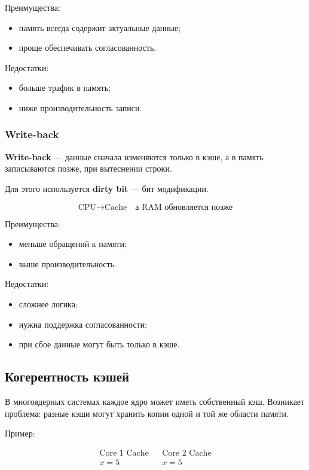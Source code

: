 \documentclass[12pt,a4paper]{article}
\theoremstyle{remark}
\begin{document}
Преимущества:
\begin{itemize}
    \item память всегда содержит актуальные данные;
    \item проще обеспечивать согласованность.
\end{itemize}

Недостатки:
\begin{itemize}
    \item больше трафик в память;
    \item ниже производительность записи.
\end{itemize}

\subsubsection{Write-back}

\textbf{Write-back} --- данные сначала изменяются только в кэше, а в память записываются позже, при вытеснении строки.

Для этого используется \textbf{dirty bit} --- бит модификации.

\[
\boxed{\text{CPU}}
\rightarrow
\boxed{\text{Cache}}
\quad
\text{а RAM обновляется позже}
\]

Преимущества:
\begin{itemize}
    \item меньше обращений к памяти;
    \item выше производительность.
\end{itemize}

Недостатки:
\begin{itemize}
    \item сложнее логика;
    \item нужна поддержка согласованности;
    \item при сбое данные могут быть только в кэше.
\end{itemize}

\subsection{Когерентность кэшей}

В многоядерных системах каждое ядро может иметь собственный кэш. Возникает проблема: разные кэши могут хранить копии одной и той же области памяти.

Пример:

\[
\begin{array}{ccc}
\boxed{\text{Core 1 Cache}} & & \boxed{\text{Core 2 Cache}} \\
x = 5 & & x = 5
\end{array}
\]
\end{document}
